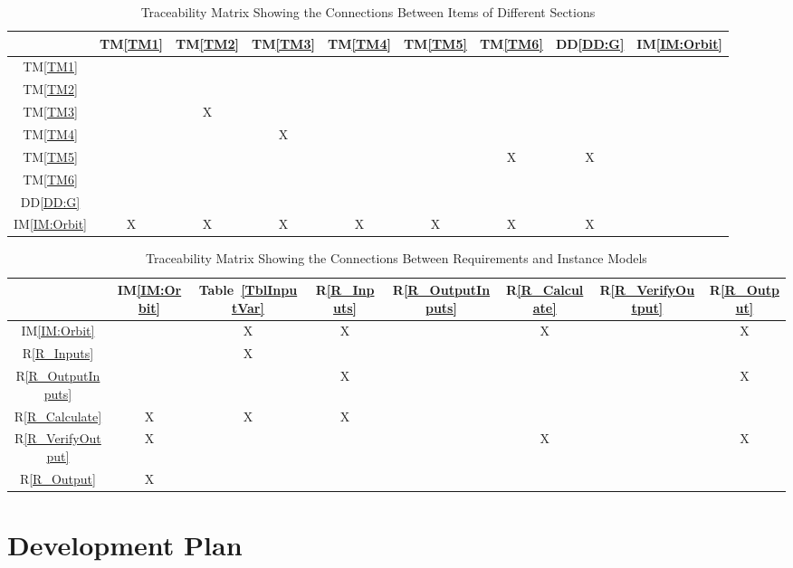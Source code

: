 \documentclass[12pt]{article}
\newcommand{\ddref}[1]{DD\ref{#1}}
\newcommand{\tref}[1]{TM\ref{#1}}
\newcommand{\iref}[1]{IM\ref{#1}}
\newcommand{\rref}[1]{R\ref{#1}}
\begin{document}
\begin{table}[h!]
\centering
\begin{tabular}{|c|c|c|c|c|c|c|c|c|}
\hline
	& \tref{TM1} & \tref{TM2} & \tref{TM3} & \tref{TM4} & \tref{TM5} & \tref{TM6} & \ddref{DD:G} & \iref{IM:Orbit} \\
\hline
\tref{TM1}          &  &  &  &  &  &  &  &  \\ \hline
\tref{TM2}          &  &  &  &  &  &  &  &  \\ \hline
\tref{TM3}          &  & X&  &  &  &  &  &  \\ \hline
\tref{TM4}          &  &  & X&  &  &  &  &  \\ \hline
\tref{TM5}          &  &  &  &  &  & X& X&  \\ \hline
\tref{TM6}          &  &  &  &  &  &  &  &  \\ \hline
\ddref{DD:G}        &  &  &  &  &  &  &  &  \\ \hline
\iref{IM:Orbit}     & X& X& X& X& X& X& X&  \\ \hline
\end{tabular}
\caption{Traceability Matrix Showing the Connections Between Items of Different Sections}
\label{Table:trace}
\end{table}

\begin{table}[h!]
\centering
\begin{tabular}{|c|c|c|c|c|c|c|c|}
\hline
	& \iref{IM:Orbit} & Table~\ref{TblInputVar} & \rref{R_Inputs} & \rref{R_OutputInputs} & \rref{R_Calculate} & \rref{R_VerifyOutput} & \rref{R_Output} \\
\hline
\iref{IM:Orbit}                &  & X& X&  & X&  & X\\ \hline
\rref{R_Inputs}                &  & X&  &  &  &  &  \\ \hline
\rref{R_OutputInputs}          &  &  & X&  &  &  & X\\ \hline
\rref{R_Calculate}             & X& X& X&  &  &  &  \\ \hline
\rref{R_VerifyOutput}          & X&  &  &  & X&  & X\\ \hline
\rref{R_Output}                & X&  &  &  &  &  &  \\ \hline
\end{tabular}
\caption{Traceability Matrix Showing the Connections Between Requirements and Instance Models}
\label{Table:R_trace}
\end{table}

\section{Development Plan}
\end{document}
